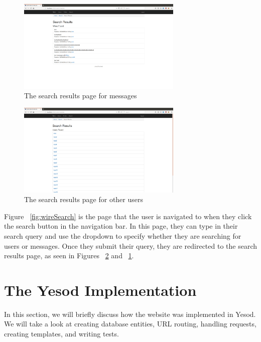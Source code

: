 \begin{figure}[H]
    \centering
    \includegraphics[width=0.7\textwidth]{final_report/pics/searchWire.png}
    \caption{The search results page for messages}
    \label{fig:wireSearchWire}
\end{figure}

\begin{figure}[H]
    \centering
    \includegraphics[width=0.7\textwidth]{final_report/pics/searchUser.png}
    \caption{The search results page for other users}
    \label{fig:wireSearchUser}
\end{figure}

Figure ~\ref{fig:wireSearch} is the page that the user is navigated to when they
click the search button in the navigation bar. In this page, they can type in
their search query and use the dropdown to specify whether they are searching
for users or messages. Once they submit their query, they are redirected to
the search results page, as seen in Figures ~\ref{fig:wireSearchUser} and
~\ref{fig:wireSearchWire}.

\section{The Yesod Implementation}

In this section, we will briefly discuss how the website was implemented in Yesod.
We will take a look at creating database entities, URL routing, handling requests,
creating templates, and writing tests.

